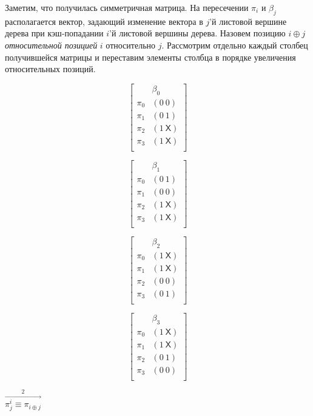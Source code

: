 Заметим, что получилась симметричная матрица. На пересечении $\pi_i$
и $\beta_j$ располагается вектор, задающий изменение вектора в $j$'й
листовой вершине дерева при кэш-попадании $i$'й листовой вершины
дерева. Назовем позицию $i \oplus j$ \emph{относительной позицией}
$i$ относительно $j$. Рассмотрим отдельно каждый столбец
получившейся матрицы и переставим элементы столбца в порядке
увеличения относительных позиций.

\parbox{0.2\textwidth}{
$$ \left[
  \begin{array}{c|c}
          & \beta_0 \\ \hline
    \pi_0 & (0~0) \\
    \pi_1 & (0~1) \\
    \pi_2 & (1~\textsf{X}) \\
    \pi_3 & (1~\textsf{X}) \\
  \end{array}
\right]
$$
}\parbox{0.2\textwidth}{
$$ \left[
  \begin{array}{c|c}
          & \beta_1 \\ \hline
    \pi_0 & (0~1) \\
    \pi_1 & (0~0) \\
    \pi_2 & (1~\textsf{X}) \\
    \pi_3 & (1~\textsf{X}) \\
  \end{array}
\right]
$$
}\parbox{0.2\textwidth}{
$$ \left[
  \begin{array}{c|c}
          & \beta_2 \\ \hline
    \pi_0 & (1~\textsf{X}) \\
    \pi_1 & (1~\textsf{X}) \\
    \pi_2 & (0~0) \\
    \pi_3 & (0~1) \\
  \end{array}
\right]
$$
}\parbox{0.2\textwidth}{
$$ \left[
  \begin{array}{c|c}
          & \beta_3 \\ \hline
    \pi_0 & (1~\textsf{X}) \\
    \pi_1 & (1~\textsf{X}) \\
    \pi_2 & (0~1) \\
    \pi_3 & (0~0) \\
  \end{array}
\right]
$$
} $\stackrel{2}{\stackrel{\longrightarrow}{\pi^i_j \equiv \pi_{i
\oplus j}}}$

